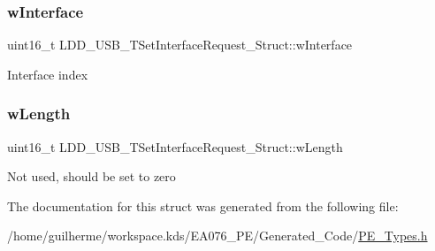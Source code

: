 \subsubsection{\texorpdfstring{w\+Interface}{wInterface}}
{\footnotesize\ttfamily uint16\+\_\+t L\+D\+D\+\_\+\+U\+S\+B\+\_\+\+T\+Set\+Interface\+Request\+\_\+\+Struct\+::w\+Interface}

Interface index \mbox{\label{struct_l_d_d___u_s_b___t_set_interface_request___struct_a7ccdd1f214e5cebbc10cde359ccba50e}} 
\subsubsection{\texorpdfstring{w\+Length}{wLength}}
{\footnotesize\ttfamily uint16\+\_\+t L\+D\+D\+\_\+\+U\+S\+B\+\_\+\+T\+Set\+Interface\+Request\+\_\+\+Struct\+::w\+Length}

Not used, should be set to zero 

The documentation for this struct was generated from the following file\+:\begin{DoxyCompactItemize}
\item 
/home/guilherme/workspace.\+kds/\+E\+A076\+\_\+\+P\+E/\+Generated\+\_\+\+Code/\hyperlink{_p_e___types_8h}{P\+E\+\_\+\+Types.\+h}\end{DoxyCompactItemize}
